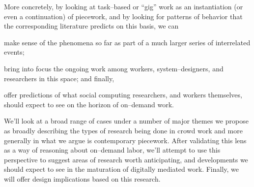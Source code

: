 \documentclass[trackingWork]{subfiles}
\begin{document}
More concretely, by looking at task--based or ``gig'' work as
an instantiation (or even a continuation) of piecework,
and by looking for patterns of behavior that the corresponding literature predicts
on this basis, we can
\begin{inlinelist}
  \item make sense of the phenomena so far as part of a much larger series of interrelated events;
  \item bring into focus the ongoing work among
        workers,
        system--designers, and
        researchers in this space;
        and finally,
  \item offer predictions of what social computing researchers,
        and workers themselves,
        should expect to see on the horizon of on--demand work.
\end{inlinelist}

We'll look at a broad range of cases under a number of major themes
we propose as broadly describing the types of research being done in crowd work
and more generally in what we argue is contemporary piecework.
After validating this lens as a way of reasoning about on--demand labor,
we'll attempt to use this perspective to suggest areas of research worth anticipating,
and developments we should expect to see in the maturation of digitally mediated work.
Finally, we will offer design implications based on this research.


\onlyinsubfile{
  \balance{}
  \printbibliography
}
\end{document}
